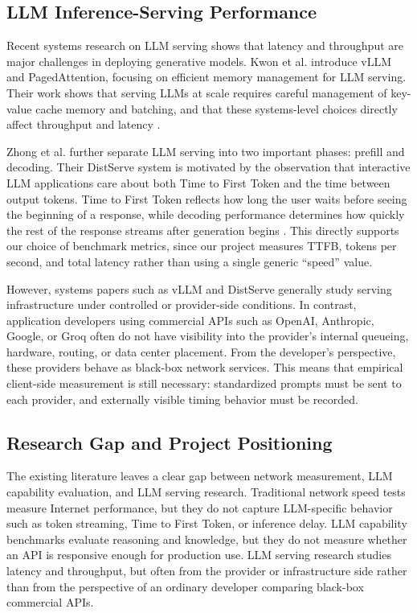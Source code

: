 \documentclass[11pt, a4paper]{article}
\begin{document}
\subsection{LLM Inference-Serving Performance}

Recent systems research on LLM serving shows that latency and throughput are major challenges in deploying generative models. Kwon et al. introduce vLLM and PagedAttention, focusing on efficient memory management for LLM serving. Their work shows that serving LLMs at scale requires careful management of key-value cache memory and batching, and that these systems-level choices directly affect throughput and latency \cite{vllm}.

Zhong et al. further separate LLM serving into two important phases: prefill and decoding. Their DistServe system is motivated by the observation that interactive LLM applications care about both Time to First Token and the time between output tokens. Time to First Token reflects how long the user waits before seeing the beginning of a response, while decoding performance determines how quickly the rest of the response streams after generation begins \cite{distserve}. This directly supports our choice of benchmark metrics, since our project measures TTFB, tokens per second, and total latency rather than using a single generic ``speed'' value.

However, systems papers such as vLLM and DistServe generally study serving infrastructure under controlled or provider-side conditions. In contrast, application developers using commercial APIs such as OpenAI, Anthropic, Google, or Groq often do not have visibility into the provider's internal queueing, hardware, routing, or data center placement. From the developer's perspective, these providers behave as black-box network services. This means that empirical client-side measurement is still necessary: standardized prompts must be sent to each provider, and externally visible timing behavior must be recorded.

\subsection{Research Gap and Project Positioning}

The existing literature leaves a clear gap between network measurement, LLM capability evaluation, and LLM serving research. Traditional network speed tests measure Internet performance, but they do not capture LLM-specific behavior such as token streaming, Time to First Token, or inference delay. LLM capability benchmarks evaluate reasoning and knowledge, but they do not measure whether an API is responsive enough for production use. LLM serving research studies latency and throughput, but often from the provider or infrastructure side rather than from the perspective of an ordinary developer comparing black-box commercial APIs.
\end{document}
